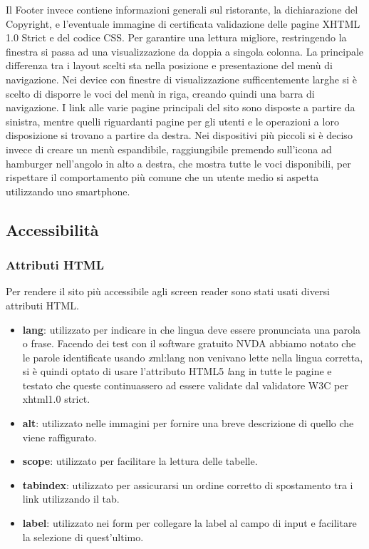 \documentclass{article}
\begin{document}
		    \bigbreak
		    Il Footer invece contiene informazioni generali sul ristorante, la dichiarazione del Copyright, e l'eventuale immagine di certificata validazione delle pagine XHTML 1.0 Strict e del codice CSS. Per garantire una lettura migliore, restringendo la finestra si passa ad una visualizzazione da doppia a singola colonna.
		    \bigbreak
		    La principale differenza tra i layout scelti sta nella posizione e presentazione del menù di navigazione. 
		    \newline Nei device con finestre di visualizzazione sufficentemente larghe si è scelto di disporre le voci del menù in riga, creando quindi una barra di navigazione. I link alle varie pagine principali del sito sono disposte a partire da sinistra, mentre quelli riguardanti pagine per gli utenti e le operazioni a loro disposizione si trovano a partire da destra.
		    \newline Nei dispositivi più piccoli si è deciso invece di creare un menù espandibile, raggiungibile premendo sull'icona ad hamburger nell'angolo in alto a destra, che mostra tutte le voci disponibili, per rispettare il comportamento più comune che un utente medio si aspetta utilizzando uno smartphone.
		\subsection{Accessibilità}
			\subsubsection{Attributi HTML}
				Per rendere il sito più accessibile agli screen reader sono stati usati diversi attributi HTML.
					\begin{itemize}
						\item {\bfseries lang}: utilizzato per indicare in che lingua deve essere pronunciata una parola o frase. Facendo dei test con il software gratuito NVDA abbiamo notato che le parole identificate usando {\textit xml:lang} non venivano lette nella lingua corretta, si è quindi optato di usare l'attributo HTML5 {\textit lang} in tutte le pagine e testato che queste continuassero ad essere validate dal validatore W3C per xhtml1.0 strict.
						\item  {\bfseries alt}: utilizzato nelle immagini per fornire una breve descrizione di quello che viene raffigurato.
						\item {\bfseries scope}: utilizzato per facilitare la lettura delle tabelle.
						\item  {\bfseries tabindex}: utilizzato per assicurarsi un ordine corretto di spostamento tra i link utilizzando il tab.
						\item  {\bfseries label}: utilizzato nei form per collegare la label al campo di input e facilitare la selezione di quest'ultimo.
					\end{itemize}
\end{document}
